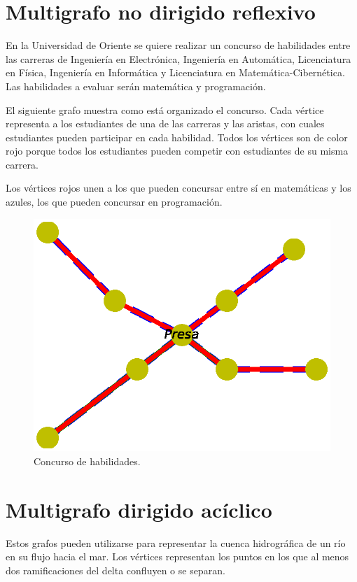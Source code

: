\documentclass{article}
\begin{document}
\section{Multigrafo no dirigido reflexivo}

En la Universidad de Oriente se quiere realizar un concurso de habilidades entre las carreras de Ingeniería en Electrónica, Ingeniería en Automática, Licenciatura en Física, Ingeniería en Informática y Licenciatura en Matemática-Cibernética. Las habilidades a evaluar serán matemática y programación. 

El siguiente grafo muestra como está organizado el concurso. Cada vértice representa a los estudiantes de una de las carreras y las aristas, con cuales estudiantes pueden participar en cada habilidad. Todos los vértices son de color rojo porque todos los estudiantes pueden competir con estudiantes de su misma carrera.

Los vértices rojos unen a los que pueden concursar entre sí en matemáticas y los azules, los que pueden concursar en programación.


\begin{figure}
  \includegraphics[width=.8\columnwidth]{8.eps}
  \caption{Concurso de habilidades.}
  \label{fig:9}
\end{figure}


\section{Multigrafo dirigido acíclico}

Estos grafos pueden utilizarse para representar la cuenca hidrográfica de un río en su flujo hacia el mar. Los vértices representan los puntos en los que al menos dos ramificaciones del delta confluyen o se separan.
\end{document}
